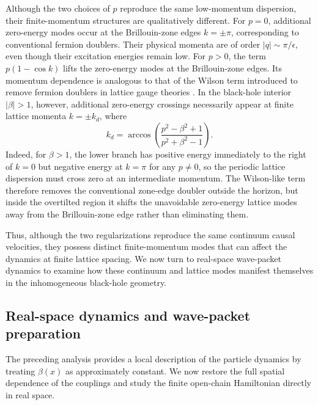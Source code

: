 \documentclass[reprint,amsmath,amssymb,aps,prb,floatfix,showkeys,superscriptaddress]{revtex4-2}
\begin{document}
Although the two choices of $p$ reproduce the same low-momentum
dispersion, their finite-momentum structures are qualitatively
different. For $p=0$, additional zero-energy modes occur at the
Brillouin-zone edges $k=\pm\pi$, corresponding to conventional
fermion doublers. Their physical momenta are of order
$|q|\sim\pi/\epsilon$, even though their excitation energies remain
low. For $p>0$, the term $p(1-\cos k)$ lifts the zero-energy modes at
the Brillouin-zone edges. Its momentum dependence is analogous to
that of the Wilson term introduced to remove fermion doublers in
lattice gauge theories \cite{Wilson1974}. In the black-hole interior $|\beta|>1$, however,
additional zero-energy crossings necessarily appear at finite lattice
momenta $k=\pm k_d$, where
\begin{equation}
  k_d
  =
  \arccos\left(
    \frac{p^2-\beta^2+1}
         {p^2+\beta^2-1}
  \right).
  \label{eq:finite_momentum_crossing}
\end{equation}
Indeed, for $\beta>1$, the lower branch has positive energy
immediately to the right of $k=0$ but negative energy at
$k=\pi$ for any $p\neq 0$, so the periodic lattice dispersion must
cross zero at an intermediate momentum. The Wilson-like term
therefore removes the conventional zone-edge doubler outside the
horizon, but inside the overtilted region it shifts the unavoidable
zero-energy lattice modes away from the Brillouin-zone edge rather
than eliminating them.

Thus, although the two regularizations reproduce the same continuum
causal velocities, they possess distinct finite-momentum modes that
can affect the dynamics at finite lattice spacing. We now turn to
real-space wave-packet dynamics to examine how these continuum and
lattice modes manifest themselves in the inhomogeneous black-hole
geometry.

\subsection{Real-space dynamics and wave-packet preparation}
\label{subsec:real_space}

The preceding analysis provides a local description of the particle
dynamics by treating $\beta(x)$ as approximately constant. We now
restore the full spatial dependence of the couplings and study the
finite open-chain Hamiltonian directly in real space.
\end{document}
